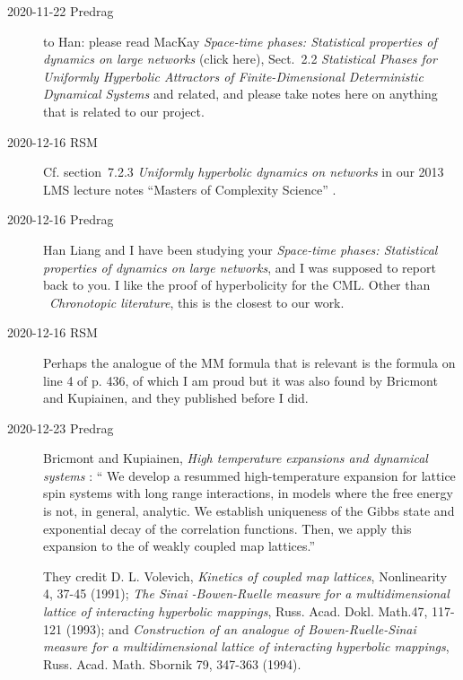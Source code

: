 \begin{description}
\item[2020-11-22 Predrag] to Han: please read
MacKay {\em Space-time phases: {S}tatistical properties of
dynamics on large networks}
{(click here)},
Sect.~2.2 {\em Statistical Phases for Uniformly Hyperbolic Attractors of
Finite-Dimensional Deterministic Dynamical Systems}
and related, and please take notes here on anything
that is related to our project.


\item[2020-12-16 RSM]
Cf. section~7.2.3 {\em Uniformly hyperbolic dynamics on networks}
in our {2013 LMS lecture notes} ``Masters of Complexity
Science'' .

\item[2020-12-16 Predrag]
Han Liang and I have been studying your {\em Space-time phases:
{S}tatistical properties of dynamics on large networks}, and
I was supposed to report back to you.
I like the proof of hyperbolicity for the {\spt} CML. Other than
~{\em Chronotopic literature}, this is the closest
to our {\spt} work.

\item[2020-12-16 RSM]
Perhaps the analogue of the MM formula that is relevant is the formula on
line 4 of p. 436, of which I am proud but it was also found by Bricmont
and Kupiainen, and they published before I did.

\item[2020-12-23 Predrag]
Bricmont and Kupiainen, \emph{High temperature expansions and dynamical
systems} : `` We develop a resummed
high-temperature expansion for lattice spin systems with long range
interactions, in models where the free energy is not, in general,
analytic. We establish uniqueness of the Gibbs state and exponential
decay of the correlation functions. Then, we apply this expansion to the
{\FPoper} of weakly coupled map lattices.''

They credit
D. L. Volevich, \emph{Kinetics of coupled map lattices},
Nonlinearity 4, 37-45 (1991);
\emph{The Sinai -Bowen-Ruelle measure for a multidimensional lattice of
interacting hyperbolic mappings},
Russ. Acad. Dokl. Math.47, 117-121 (1993);
 and
\emph{Construction of an analogue of Bowen-Ruelle-Sinai measure for a
multidimensional lattice of interacting hyperbolic mappings},
Russ. Acad. Math. Sbornik 79, 347-363 (1994).


\end{description}
